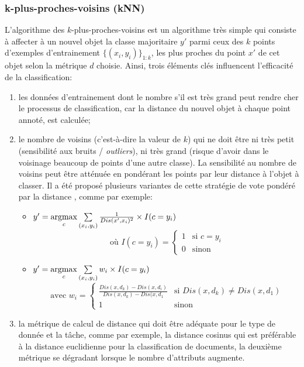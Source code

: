 \subsubsection{k-plus-proches-voisins (kNN)}
L'algorithme des $k$-plus-proches-voisins est un algorithme très simple qui consiste à affecter à un nouvel objet la classe majoritaire $y'$ parmi ceux des $k$ points d'exemples d'entrainement $\lbrace (x_i,y_i) \rbrace_{1:k}$, les plus proches du point $x'$ de cet objet selon la métrique $d$ choisie. Ainsi, trois éléments clés influencent l'efficacité de la classification:
\begin{enumerate}
	\item les données d'entrainement dont le nombre s'il est très grand peut rendre cher le processus de classification, car la distance du nouvel objet à chaque point annoté, est calculée;
	\item le nombre de voisins (c'est-à-dire la valeur de $k$) qui ne doit être ni très petit (sensibilité aux bruits / \textit{outliers}), ni très grand (risque d'avoir dans le voisinage beaucoup de points d'une autre classe). La sensibilité au nombre de voisins peut être atténuée en pondérant les points par leur distance à l'objet à classer. Il a été proposé plusieurs variantes de cette stratégie de \og vote pondéré par la distance \fg{}, comme par exemple:
	\begin{itemize}
		\item $y' = \mathop{\mathrm{argmax}}\limits\limits_c \sum\limits_{(x_i,y_i)} \frac{1}{Dis(x', x_i)^2} \times I(c = y_i)$  \citep{dudani1976originalwknn} \[\text{ où } I(c=y_i) = \left\lbrace \begin{array}{ll}
		1 & \text{si }c = y_i \\
		0 & \text{sinon}
		\end{array} \right.\]
		\item $y' = \mathop{\mathrm{argmax}}\limits\limits_c \sum\limits_{(x_i,y_i)} w_i \times I(c = y_i)$ \citep{gou2011wknn} \[\text{ avec } w_i = \left\lbrace \begin{array}{ll}
		\frac{Dis(x, d_k) - Dis(x, d_i)}{Dis(x, d_k) - Dis(x, d_1} & \text{si } Dis(x, d_k) \neq Dis(x, d_1) \\
		1 & \text{sinon}
		\end{array} \right.\]
	\end{itemize}
	 
	\item la métrique de calcul de distance qui doit être adéquate pour le type de donnée et la tâche, comme par exemple, la distance cosinus qui est préférable à la distance euclidienne pour la classification de documents, la deuxième métrique se dégradant lorsque le nombre d'attributs augmente.
\end{enumerate}

